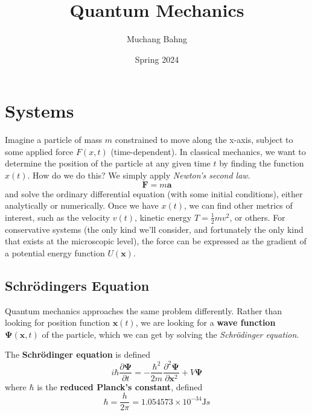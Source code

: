 \documentclass{article}
\begin{document}
\title{Quantum Mechanics}
\author{Muchang Bahng}
\date{Spring 2024}

\maketitle
\tableofcontents
\pagebreak

\section{Systems} 

  Imagine a particle of mass $m$ constrained to move along the x-axis, subject to some applied force $F(x, t)$ (time-dependent). In classical mechanics, we want to determine the position of the particle at any given time $t$ by finding the function $x(t)$. How do we do this? We simply apply \textit{Newton's second law}. 
  \begin{equation} 
    \mathbf{F} = m \mathbf{a}
  \end{equation}
  and solve the ordinary differential equation (with some initial conditions), either analytically or numerically. Once we have $x(t)$, we can find other metrics of interest, such as the velocity $v(t)$, kinetic energy $T = \frac{1}{2} mv^2$, or others. For conservative systems (the only kind we'll consider, and fortunately the only kind that exists at the microscopic level), the force can be expressed as the gradient of a potential energy function $U(\mathbf{x})$. 

  \subsection{Schr\"odingers Equation}

    Quantum mechanics approaches the same problem differently. Rather than looking for position function $\mathbf{x}(t)$, we are looking for a \textbf{wave function} $\boldsymbol{\Psi}(\mathbf{x}, t)$ of the particle, which we can get by solving the \textit{Schr\"odinger equation}. 

    \begin{definition}
      \label{def:schr-odinger-equation}
      The \textbf{Schr\"odinger equation} is defined 
      \begin{equation} 
        i \hbar \frac{\partial \boldsymbol{\Psi}}{\partial t} = - \frac{\hbar^2}{2m} \frac{\partial^2 \boldsymbol{\Psi}}{\partial \mathbf{x}^2} + V \boldsymbol{\Psi}
      \end{equation}
      where $\hbar$ is the \textbf{reduced Planck's constant}, defined 
      \begin{equation} 
        \hbar = \frac{h}{2\pi} = 1.054573 \times 10^{-34} \mathrm{J}s
      \end{equation}
    \end{definition}
\end{document}
